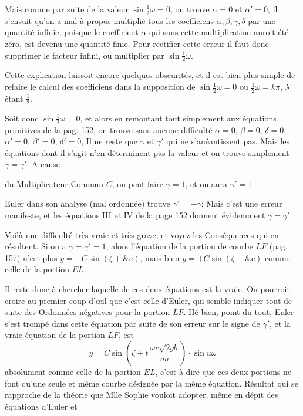 \documentclass[11pt,a4paper]{article}
\begin{document}
Mais comme par suite de la valeur $\sin \frac{1}{2}\omega = 0$, on trouve
$\alpha = 0$ et $\alpha' = 0$, il s'ensuit qu'on a mal à propos multiplié
tous les coefficiens $\alpha, \beta, \gamma, \delta$ par une quantité
infinie, puisque le coefficient $\alpha$ qui sans cette multiplication auroit
été zéro, est devenu une quantité finie. Pour rectifier cette erreur il faut
donc supprimer le facteur infini, ou multiplier par $\sin \frac{1}{2}\omega$.

Cette explication laissoit encore quelques obscurités, et il est bien plus
simple de refaire le calcul des coefficiens dans la supposition de
$\sin \frac{1}{2}\omega = 0$ ou $\frac{1}{2}\omega = k\pi$, $\lambda$ étant
$\frac{1}{2}$.

Soit donc $\sin \frac{1}{2}\omega = 0$, et alors en remontant tout
simplement aux équations primitives de la pag. 152, on trouve \struck{\ill{}}
sans aucune difficulté $\alpha = 0$, $\beta = 0$, $\delta = 0$,
$\alpha' = 0$, $\beta' = 0$, $\delta' = 0$, Il ne reste que $\gamma$ et
$\gamma'$ qui ne s'anéantissent pas. Mais les équations dont il s'agit n'en
déterminent pas la valeur et on trouve simplement $\gamma = \gamma'$. A cause


du Multiplicateur Commun $C$, on peut faire $\gamma = 1$, et on aura
$\gamma' = 1$

Euler dans son analyse (mal ordonnée) trouve $\gamma' = -\gamma$; Mais c'est
une erreur manifeste, et les équations III et IV de la page 152 donnent
évidemment $\gamma = \gamma'$.

Voilà une difficulté très vraie et très grave, et voyez les Conséquences qui
en résultent. Si on a $\gamma = \gamma' = 1$, alors l'équation de la portion
de courbe $LF$ (pag. 157) n'est plus $y = -C \sin(\zeta + \text{\&c})$, mais
bien $y = +C \sin(\zeta + \text{\&c})$ comme celle de la portion $EL$.
\struck{\ill{}}


Il reste donc à chercher laquelle de ces deux équations est la vraie. On
pourroit croire au premier coup d'œil que c'est celle d'Euler, qui semble
indiquer tout de suite des Ordonnées négatives pour la portion $LF$. Hé bien,
point du tout, Euler s'est trompé dans cette équation par suite de son erreur
sur le signe de $\gamma'$, et la vraie équation de la portion $LF$, est
\[
y = C \sin\left(\zeta + t\,\frac{\omega c \sqrt{2gb}}{aa}\right) \cdot
\sin u\omega
\]
absolument comme celle de la portion $EL$, c'est-à-dire que ces deux
portions ne font qu'une seule et même courbe désignée par la même équation.
Résultat qui se rapproche  de la théorie que Mlle Sophie
vouloit adopter, même en dépit des équations d'Euler et
\end{document}

